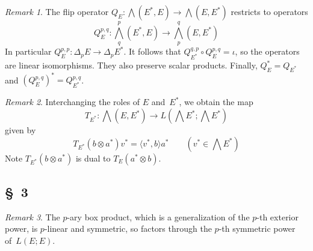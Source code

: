 \documentclass[letterpaper,12pt]{article}
\newcommand{\after}{\circ}
\newcommand{\tprod}{\otimes}
\newcommand{\bigeprod}{\bigwedge}
\newcommand{\medeprod}{{\textstyle\bigeprod}}
\newcommand{\sprod}[2]{\langle#1,#2\rangle}
\theoremstyle{definition}
\theoremstyle{remark}
\newtheorem*{rmk}{Remark}
\begin{document}
\begin{rmk}
The flip operator \(Q_E:\medeprod(E^*,E)\to\medeprod(E,E^*)\) restricts to operators
\[Q_E^{p,q}:\medeprod^p_q(E^*,E)\to\medeprod^q_p(E,E^*)\]
In particular \(Q_E^{p,p}:\Delta_p E\to\Delta_p E^*\). It follows that \(Q_{E^*}^{q,p}\after Q_E^{p,q}=\iota\), so the operators are linear isomorphisms. They also preserve scalar products. Finally, \(Q_E^*=Q_{E^*}\) and \((Q_E^{p,q})^*=Q_{E^*}^{p,q}\).
\end{rmk}

\begin{rmk}
Interchanging the roles of \(E\) and~\(E^*\), we obtain the map
\[T_{E^*}:\medeprod(E,E^*)\to L(\medeprod E^*;\medeprod E^*)\]
given by
\[T_{E^*}(b\tprod a^*)v^*=\sprod{v^*}{b}a^*\qquad(v^*\in\medeprod E^*)\]
Note \(T_{E^*}(b\tprod a^*)\) is dual to \(T_E(a^*\tprod b)\).
\end{rmk}

\subsection*{\S~3}
\begin{rmk}
The \(p\)-ary box product, which is a generalization of the \(p\)-th exterior power, is \(p\)-linear and symmetric, so factors through the \(p\)-th symmetric power of~\(L(E;E)\).
\end{rmk}
\end{document}
